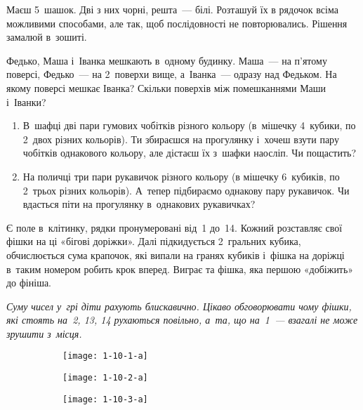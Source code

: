 \problem
Маєш 5~шашок. Дві з них чорні, решта~--- білі.
Розташуй їх в рядочок всіма можливими способами, але так,
щоб послідовності не повторювались.
Рішення замалюй в~зошиті.


\problem
Федько, Маша і~Іванка мешкають в~одному будинку.
Маша~--- на п’ятому поверсі, Федько~--- на 2~поверхи вище,
а~Іванка~--- одразу над Федьком.
На якому поверсі мешкає Іванка?
Скільки поверхів між помешканнями Маши і~Іванки?


\problem
{}
\begin{enumerate}
    \item В~шафці дві пари гумових чобітків різного кольору
    (в~мішечку 4~кубики, по 2~двох різних кольорів).
    Ти збираєшся на прогулянку і~хочеш взути пару чобітків однакового кольору,
    але дістаєш їх з~шафки наосліп. Чи пощастить?
    \item На поличці три пари рукавичок різного кольору
    (в мішечку 6~кубиків, по 2~трьох різних кольорів).
    А~тепер підбираємо однакову пару рукавичок.
    Чи вдасться піти на прогулянку в~однакових рукавичках?
\end{enumerate}


\problem
{}
Є поле в~клітинку, рядки пронумеровані від~1 до~14.
Кожний розставляє свої фішки на ці «бігові доріжки».
Далі підкидується 2~гральних кубика, обчислюється сума крапочок,
які випали на гранях кубиків і~фішка на доріжці в~таким номером
робить крок вперед.
Виграє та фішка, яка першою «добіжить» до фініша.

\emph{
Суму чисел у~грі діти рахують блискавично.
Цікаво обговорювати чому фішки, які стоять на~2, 13, 14 рухаються повільно,
а~та, що на~1~--- взагалі не може зрушити з~місця.
}


\problem
{}

\begin{figure}[h]
    \centering
    \quad \quad
    \begin{subfigure}{0.3\textwidth}
        \texttt{[image: 1-10-1-a]}
    \end{subfigure}
    \begin{subfigure}{0.3\textwidth}
        \texttt{[image: 1-10-2-a]}
    \end{subfigure}
    \begin{subfigure}{0.3\textwidth}
        \texttt{[image: 1-10-3-a]}
    \end{subfigure}
\end{figure}


